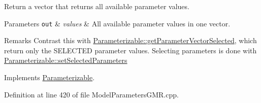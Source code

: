Return a vector that returns all available parameter values. 


\begin{DoxyParams}[1]{Parameters}
\mbox{\tt out}  & {\em values} & All available parameter values in one vector. \\
\hline
\end{DoxyParams}
\begin{DoxyRemark}{Remarks}
Contrast this with \hyperlink{classDmpBbo_1_1Parameterizable_aab955bec57f074a991b8be31d6ce54ca}{Parameterizable\+::get\+Parameter\+Vector\+Selected}, which return only the S\+E\+L\+E\+C\+T\+E\+D parameter values. Selecting parameters is done with \hyperlink{classDmpBbo_1_1Parameterizable_a8a976b5db2d1809ece10e431816f0f27}{Parameterizable\+::set\+Selected\+Parameters} 
\end{DoxyRemark}


Implements \hyperlink{classDmpBbo_1_1Parameterizable_addcd9c243e3d9e104c9a4513c81e3b5b}{Parameterizable}.



Definition at line 420 of file Model\+Parameters\+G\+M\+R.\+cpp.


